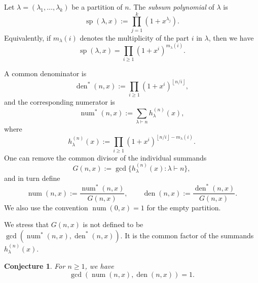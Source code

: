 \documentclass[12pt]{amsart}
\newtheorem{conjecture}{Conjecture}
\DeclareMathOperator{\spol}{sp}
\DeclareMathOperator{\num}{num}
\DeclareMathOperator{\den}{den}
\newcommand{\floor}[1]{\left\lfloor #1\right\rfloor}
\begin{document}
Let \(\lambda=(\lambda_1,\ldots,\lambda_k)\) be a partition of \(n\).  The
\emph{subsum polynomial} of \(\lambda\) is
\begin{equation}
   \spol(\lambda,x):=\prod_{j=1}^k(1+x^{\lambda_j}).
\end{equation}
Equivalently, if \(m_\lambda(i)\) denotes the multiplicity of the part \(i\) in
\(\lambda\), then we have
\[
   \spol(\lambda,x)=\prod_{i\ge1}(1+x^i)^{m_\lambda(i)}.
\]

A common denominator is
$$
   \den^*(n,x):=\prod_{i\ge1}(1+x^i)^{\floor{n/i}},
$$
and the corresponding numerator is
$$
   \num^*(n,x):=\sum_{\lambda\vdash n}h_\lambda^{(n)}(x),
$$
where
$$
   h_\lambda^{(n)}(x):=
   \prod_{i\ge1}(1+x^i)^{\floor{n/i}-m_\lambda(i)}.
$$
One can remove the common divisor of the individual summands 
\[
   G(n,x):=\gcd\{h_\lambda^{(n)}(x):\lambda\vdash n\},
\]
and in turn define
\begin{equation}
   \num(n,x):=\frac{\num^*(n,x)}{G(n,x)},
   \qquad
   \den(n,x):=\frac{\den^*(n,x)}{G(n,x)}.
\end{equation}
We also use the convention \(\num(0,x)=1\) for the empty partition.

We stress that \(G(n,x)\) is not defined to be
\(\gcd(\num^*(n,x),\den^*(n,x))\).  It is the common factor of the summands
\(h_\lambda^{(n)}(x)\).

\begin{conjecture}\label{conj:conj2}  For \(n\ge1\), we have
\[
   \gcd(\num(n,x),\den(n,x))=1.
\]
\end{conjecture}
\end{document}
